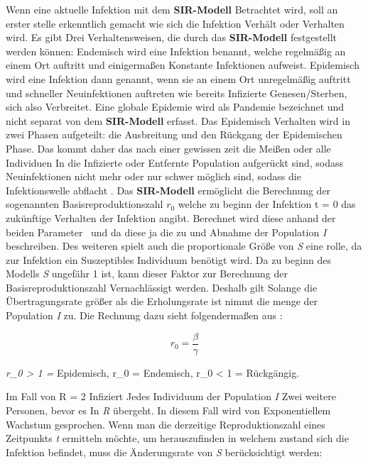\documentclass[12pt]{scrartcl} %
\begin{document}
Wenn eine aktuelle Infektion mit dem \textbf{SIR-Modell} Betrachtet wird, soll an erster stelle erkenntlich gemacht wie sich die Infektion Verhält oder Verhalten wird. Es gibt Drei Verhaltensweisen, die durch das \textbf{SIR-Modell} festgestellt werden können: Endemisch wird eine Infektion benannt, welche regelmäßig an einem Ort auftritt und einigermaßen Konstante Infektionen aufweist. Epidemisch wird eine Infektion dann genannt, wenn sie an einem Ort unregelmäßig auftritt und schneller Neuinfektionen auftreten wie bereits Infizierte Genesen/Sterben, sich also Verbreitet. Eine globale Epidemie wird als Pandemie bezeichnet und nicht separat von dem \textbf{SIR-Modell} erfasst. Das Epidemisch Verhalten wird in zwei Phasen aufgeteilt: die Ausbreitung und den Rückgang der Epidemischen Phase. Das kommt daher das nach einer gewissen zeit die Meißen oder alle Individuen In die Infizierte oder Entfernte Population aufgerückt sind, sodass Neuinfektionen nicht mehr oder nur schwer möglich sind, sodass die Infektionswelle abflacht \cite{3,5}. Das \textbf{SIR-Modell} ermöglicht die Berechnung der sogenannten Basisreproduktionszahl  $r_{0}$
welche zu beginn der Infektion t = 0 das zukünftige Verhalten der Infektion angibt. Berechnet wird diese anhand der beiden Parameter \textbeta\ und \textgamma\space da diese ja die zu und Abnahme der Population \textit{I} beschreiben. Des weiteren spielt auch die proportionale Größe von \textit{S} eine rolle, da zur Infektion ein Suszeptibles Individuum benötigt wird. Da zu beginn des Modells \textit{S} ungefähr 1 ist, kann dieser Faktor zur Berechnung der Basisreproduktionszahl Vernachlässigt werden. Deshalb gilt Solange die Übertragungsrate \textbeta\space größer als die Erholungsrate \textgamma\space ist nimmt die menge der Population \textit{I} zu. Die Rechnung dazu sieht folgendermaßen aus \cite{6,3}:

$$ r_{0} = \frac{\beta}{\gamma} $$

\begin{center}
\textit{r_{0} > 1 =} \textnormal{Epidemisch}, r_{0}  = \textnormal{Endemisch}, r_{0} < 1 = \textnormal{Rückgängig.}
\end{center}
Im Fall von R = 2 Infiziert Jedes Individuum der Population \textit{I} Zwei weitere Personen, bevor es In \textit{R} übergeht. In diesem Fall wird von Exponentiellem Wachstum gesprochen.
Wenn man die derzeitige Reproduktionszahl eines Zeitpunkts \textit{t} ermitteln möchte, um herauszufinden in welchem zustand sich die Infektion befindet, muss die Änderungsrate von \textit{S} berücksichtigt werden:
\end{document}

